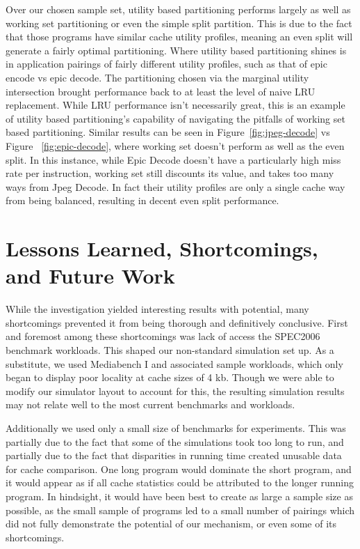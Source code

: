 \documentclass{acm_proc_article-sp}
\begin{document}
Over our chosen sample set, utility based partitioning performs largely as well as working set partitioning or even the simple split partition. This is due to the fact that those programs have similar cache utility profiles, meaning an even split
will generate a fairly optimal partitioning. Where utility based partitioning shines is in application pairings of fairly different
utility profiles, such as that of epic encode vs epic decode. The partitioning chosen via the marginal utility intersection brought performance back to at least the level of naive LRU replacement. While LRU performance isn't necessarily great,  this is an example of utility based partitioning's capability of navigating the pitfalls of working set based partitioning. Similar results can be seen in Figure~\ref{fig:jpeg-decode} vs Figure ~\ref{fig:epic-decode}, where working set doesn't perform as well as the even split. In this instance, while Epic Decode doesn't have a particularly high miss rate per instruction, working set still discounts its value, and takes too many ways from Jpeg Decode.  In fact their utility profiles are only a single cache way from being balanced, resulting in decent even split performance.

\section{Lessons Learned, Shortcomings, and Future Work}
 
While the investigation yielded interesting results with potential, many shortcomings prevented it from being thorough and definitively conclusive. First and foremost among these shortcomings was lack of access the SPEC2006 benchmark workloads. This shaped our non-standard simulation set up. As a substitute, we used Mediabench I and associated sample workloads, which only began to display poor locality at cache sizes of 4 kb. Though we were able to modify our simulator layout to account for this, the resulting simulation results may not relate well to the most current benchmarks and workloads.

Additionally we used only a small size of benchmarks for experiments. This was partially due to the fact that some of the simulations took too long to run, and partially due to the fact that disparities in running time created unusable data for
cache comparison. One long program would dominate the short program, and it would appear as if all cache statistics could be attributed to the longer running program. In hindsight, it would have been best to create as large a sample size
as possible, as the small sample of programs led to a small number of pairings which did not fully demonstrate the potential of our mechanism, or even some of its shortcomings.
\end{document}
